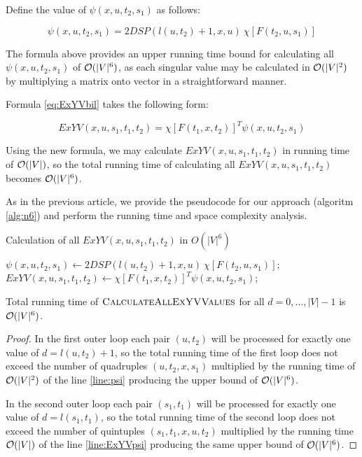 Define the value of $\psi(x, u, t_2, s_1)$ as follows:

\begin{equation}
\psi(x, u, t_2, s_1) = 2DSP(l(u, t_2) + 1, x, u)~\chi[F(t_2, u, s_1)] \label{eq:psi}
\end{equation}

The formula above provides an upper running time bound for calculating all $\psi(x, u, t_2, s_1)$ of $\mathcal{O}(|V|^6)$, as each singular value may be calculated in $\mathcal{O}(|V|^2)$ by multiplying a matrix onto vector in a straightforward manner. 

Formula \eqref{eq:ExYVbil} takes the following form:

\begin{equation}
ExYV(x, u, s_1, t_1, t_2) = \chi[F(t_1, x, t_2)]^T \psi(x, u, t_2, s_1) \label{eq:ExYVpsi}
\end{equation}

Using the new formula, we may calculate $ExYV(x, u, s_1, t_1, t_2)$ in running time of $\mathcal{O}(|V|)$, so the total running time of calculating all $ExYV(x, u, s_1, t_1, t_2)$ becomes $\mathcal{O}(|V|^6)$.

As in the previous article, we provide the pseudocode for our approach (algoritm \ref{alg:n6}) and perform the running time and space complexity analysis.

\begin{algorithm}
\caption{Calculation of all $ExYV(x, u, s_1, t_1, t_2)$ in $O(|V|^6)$} \label{alg:n6}
\begin{algorithmic}[1]
            \State $\psi(x, u, t_2, s_1) \gets 2DSP(l(u, t_2) + 1, x, u)~\chi[F(t_2, u, s_1)]; \label{line:psi}$
        \EndFor
    \EndFor
                \State $ExYV(x, u, s_1, t_1, t_2) \gets \chi[F(t_1, x, t_2)]^T \psi(x, u, t_2, s_1)$; \label{line:ExYVpsi}
            \EndFor
        \EndFor
    \EndFor
\EndProcedure
\end{algorithmic}
\end{algorithm}

\begin{proposition}
Total running time of $\textsc{CalculateAllExYVValues}$ for all $d = 0, \ldots, |V|-1$ is $\mathcal{O}(|V|^6)$. 
\end{proposition}
\begin{proof}
In the first outer loop each pair $(u, t_2)$ will be processed for exactly one value of $d = l(u, t_2) + 1$, so the total running time of the first loop does not exceed the number of quadruples $(u, t_2, x, s_1)$ multiplied by the running time of $\mathcal{O}(|V|^2)$ of the line \ref{line:psi} producing the upper bound of $\mathcal{O}(|V|^6)$.

In the second outer loop each pair $(s_1, t_1)$ will be processed for exactly one value of $d = l(s_1, t_1)$, so the total running time of the second loop does not exceed the number of quintuples $(s_1, t_1, x, u, t_2)$ multiplied by the running time $\mathcal{O}(|V|)$ of the line \ref{line:ExYVpsi} producing the same upper bound of $\mathcal{O}(|V|^6)$.
\end{proof}

